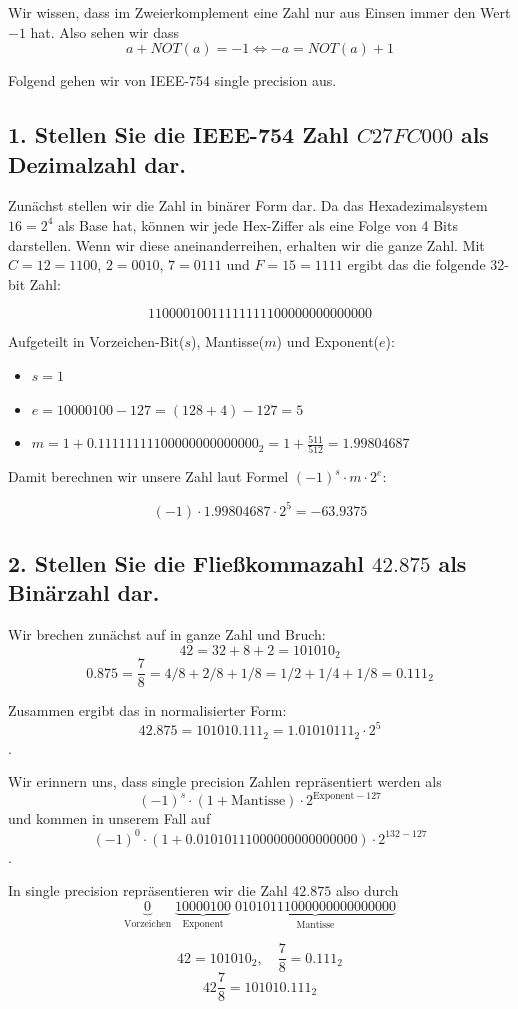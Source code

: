 \documentclass{article}
\begin{document}
Wir wissen, dass im Zweierkomplement eine Zahl nur aus Einsen immer den Wert $-1$ hat. Also sehen wir dass
$$
a + NOT(a) = -1 \iff -a = NOT(a) + 1
$$

\newpage

Folgend gehen wir von IEEE-754 single precision aus.

\subsection*{1. Stellen Sie die IEEE-754 Zahl $C27FC000$ als Dezimalzahl dar.}

Zunächst stellen wir die Zahl in binärer Form dar. Da das Hexadezimalsystem $16 = 2^4$ als Base hat,
können wir jede Hex-Ziffer als eine Folge von 4 Bits darstellen. Wenn wir diese aneinanderreihen, erhalten wir die 
ganze Zahl. Mit $C = 12 = 1100$, $2 = 0010$, $7 = 0111$ und $F = 15 = 1111$ ergibt das die folgende 32-bit Zahl:

$$11000010011111111100000000000000$$

Aufgeteilt in Vorzeichen-Bit($s$), Mantisse($m$) und Exponent($e$):
\begin{itemize}
    \item $s = 1$
    \item $e = 10000100 - 127 = (128 + 4) - 127 = 5$
    \item $m = 1 + 0.11111111100000000000000_2 = 1 + \frac{511}{512} =  1.99804687$
\end{itemize}

Damit berechnen wir unsere Zahl laut Formel $(-1)^s \cdot m \cdot 2^e$:

$$(-1) \cdot 1.99804687 \cdot 2^5 = -63.9375$$

\subsection*{2. Stellen Sie die Fließkommazahl $42.875$ als Binärzahl dar.}

Wir brechen zunächst auf in ganze Zahl und Bruch:
$$42 = 32 + 8 + 2 = 101010_2$$
$$0.875 = \frac{7}{8} = 4/8 + 2/8 + 1/8 = 1/2 + 1/4 + 1/8 = 0.111_2$$

Zusammen ergibt das in normalisierter Form: 
$$42.875 = 101010.111_2 = 1.01010111_2 \cdot 2^5$$.

Wir erinnern uns, dass single precision Zahlen repräsentiert werden als
$$(-1)^s \cdot (1+\text{Mantisse}) \cdot 2^{\text{Exponent} - 127}$$ und kommen in unserem Fall auf
$$(-1)^0 \cdot (1 + 0.01010111000000000000000) \cdot 2^{132-127}$$.

In single precision repräsentieren wir die Zahl $42.875$ also durch
$$ \underbrace{0}_{\text{Vorzeichen}} \; \underbrace{10000100}_{\text{Exponent}} \; \underbrace{01010111000000000000000}_{\text{Mantisse}} $$


$$42 = 101010_2, \quad \frac{7}{8} = 0.111_2$$
$$42\frac{7}{8} = 101010.111_2$$
\end{document}
